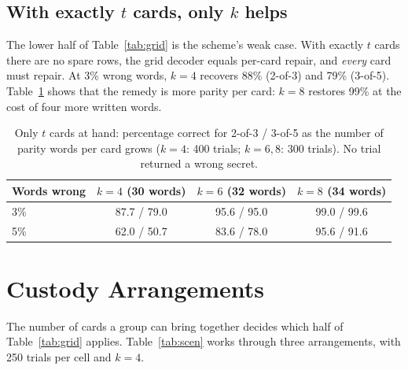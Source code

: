 \documentclass[numeric]{anvil-paper}
\begin{document}
\subsection{With exactly $t$ cards, only $k$ helps}

The lower half of Table~\ref{tab:grid} is the scheme's weak case. With exactly
$t$ cards there are no spare rows, the grid decoder equals per-card repair, and
\emph{every} card must repair. At 3\% wrong words, $k=4$ recovers 88\% (2-of-3)
and 79\% (3-of-5). Table~\ref{tab:k} shows that the remedy is more parity per
card: $k=8$ restores 99\% at the cost of four more written words.

\begin{table}[tb]
\centering
\caption{Only $t$ cards at hand: percentage correct for 2-of-3 / 3-of-5 as the
number of parity words per card grows ($k=4$: 400 trials; $k=6,8$: 300
trials). No trial returned a wrong secret.}
\label{tab:k}
\small
\begin{tabular}{lccc}
\toprule
Words wrong & $k=4$ (30 words) & $k=6$ (32 words) & $k=8$ (34 words) \\
\midrule
3\% & 87.7 / 79.0 & 95.6 / 95.0 & 99.0 / 99.6 \\
5\% & 62.0 / 50.7 & 83.6 / 78.0 & 95.6 / 91.6 \\
\bottomrule
\end{tabular}
\end{table}

\section{Custody Arrangements}
\label{sec:scenarios}

The number of cards a group can bring together decides which half of
Table~\ref{tab:grid} applies. Table~\ref{tab:scen} works through three
arrangements, with 250 trials per cell and $k=4$.
\end{document}
